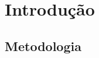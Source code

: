 \documentclass{article}
\begin{document}
\section{Introdução}

\subsection{Metodologia}
\end{document}
